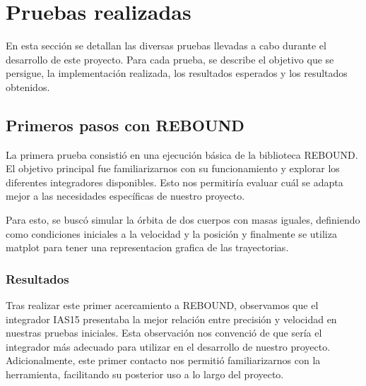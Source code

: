 \section{Pruebas realizadas}
En esta sección se detallan las diversas pruebas llevadas a cabo durante el desarrollo de este proyecto. Para cada prueba, se describe el objetivo que se persigue, la implementación realizada, los resultados esperados y los resultados obtenidos.

\subsection{Primeros pasos con REBOUND}
La primera prueba consistió en una ejecución básica de la biblioteca REBOUND. El objetivo principal fue familiarizarnos con su funcionamiento y explorar los diferentes integradores disponibles. Esto nos permitiría evaluar cuál se adapta mejor a las necesidades específicas de nuestro proyecto.

Para esto, se buscó simular la órbita de dos cuerpos con masas iguales, definiendo como condiciones iniciales a la velocidad y la posición y finalmente se utiliza matplot para tener una representacion grafica de las trayectorias.
\subsubsection{Resultados}
Tras realizar este primer acercamiento a REBOUND, observamos que el integrador IAS15 presentaba la mejor relación entre precisión y velocidad en nuestras pruebas iniciales. Esta observación nos convenció de que sería el integrador más adecuado para utilizar en el desarrollo de nuestro proyecto. Adicionalmente, este primer contacto nos permitió familiarizarnos con la herramienta, facilitando su posterior uso a lo largo del proyecto.

